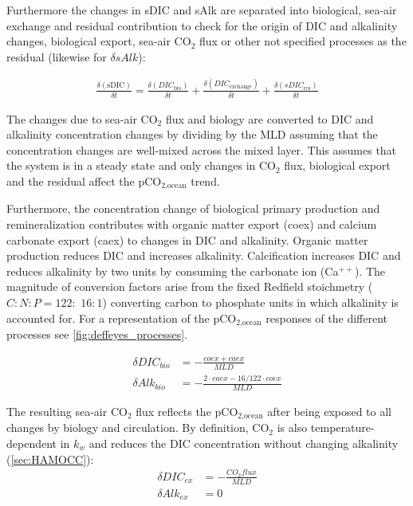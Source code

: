 Furthermore the changes in sDIC and sAlk are separated into biological, sea-air exchange and residual contribution to check for the origin of \acs{DIC} and alkalinity changes, \ie biological export, sea-air CO$_2$ flux or other not specified processes as the residual (likewise for $\delta sAlk$):

\begin{align}
\frac{\delta (\text{sDIC})}{\delta t}=\frac{\delta (DIC_{\text{bio}})}{\delta t}+\frac{\delta (DIC_{\text{exchange}})}{\delta t}+\frac{\delta (sDIC_{\text{res}})}{\delta t}
\end{align}

The changes due to sea-air CO$_2$ flux and biology are converted to \acs{DIC} and alkalinity concentration changes by dividing by the \ac{MLD} assuming that the concentration changes are well-mixed across the mixed layer. This assumes that the system is in a steady state and only changes in CO$_2$ flux, biological export and the residual affect the pCO$_{\text{2,ocean}}$ trend.

Furthermore, the concentration change of biological primary production and remineralization contributes with organic matter export (coex) and calcium carbonate export (caex) to changes in \acs{DIC} and alkalinity. 
Organic matter production reduces \acs{DIC} and increases alkalinity. Calcification increases \acs{DIC} and reduces alkalinity by two units by consuming the carbonate ion (Ca$^{++}$). The magnitude of conversion factors arise from the fixed Redfield stoichmetry ($C:N:P = 122:$ $16:1$) converting carbon to phosphate units in which alkalinity is accounted for. %
For a representation of the pCO$_{\text{2,ocean}}$ responses of the different processes see \autoref{fig:deffeyes_processes}.

\begin{align}
\delta DIC_{bio}&=-\frac{coex+caex}{MLD} \label{eq:mld}\\
\delta Alk_{bio}&=-\frac{2 \cdot caex-16/122 \cdot coex}{MLD}
\end{align}

The resulting sea-air CO$_2$ flux reflects the pCO$_{\text{2,ocean}}$ after being exposed to all changes by biology and circulation. By definition, CO$_2$ is also temperature-dependent in $k_w$ and reduces the \acs{DIC} concentration without changing alkalinity (\autoref{sec:HAMOCC}):
\begin{align}
\delta DIC_{ex}&=-\frac{CO_2 flux}{MLD} \label{eq:mlde} \\
\delta Alk_{ex}&=0
\end{align}

